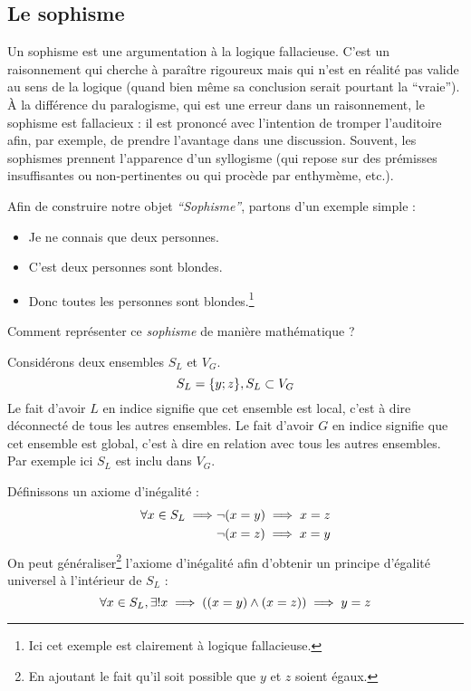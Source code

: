 \documentclass[12pt]{article} %
\begin{document}
\subsection{Le sophisme}

Un sophisme est une argumentation à la logique fallacieuse. C'est un raisonnement qui cherche à paraître rigoureux mais qui n'est en réalité pas valide au sens de la logique (quand bien même sa conclusion serait pourtant la ``vraie''). À la différence du paralogisme, qui est une erreur dans un raisonnement, le sophisme est fallacieux : il est prononcé avec l'intention de tromper l'auditoire afin, par exemple, de prendre l'avantage dans une discussion. Souvent, les sophismes prennent l'apparence d'un syllogisme (qui repose sur des prémisses insuffisantes ou non-pertinentes ou qui procède par enthymème, etc.). \newline

Afin de construire notre objet \textit{``Sophisme''}, partons d'un exemple simple : \newline
\begin{itemize}
\item Je ne connais que deux personnes.
\item C'est deux personnes sont blondes.
\item Donc toutes les personnes sont blondes.\footnote{Ici cet exemple est clairement à logique fallacieuse.} \newline
\end{itemize}
{\large Comment représenter ce \textit{sophisme} de manière mathématique ?}

Considérons deux ensembles $S_{L}$ et $V_{G}$. 
\begin{equation}
S_{L} = \{y; \space z\}, \space S_{L} \subset V_{G}
\end{equation}
Le fait d'avoir $L$ en indice signifie que cet ensemble est local, c'est à dire déconnecté de tous les autres ensembles. \newline
Le fait d'avoir $G$ en indice signifie que cet ensemble est global, c'est à dire en relation avec tous les autres ensembles. Par exemple ici $S_{L}$ est inclu dans $V_{G}$.

Définissons un axiome d'inégalité :
\begin{align} 
\forall x \in S_{L} \implies & \lnot (x \space = \space y) \implies x \space = \space z \\
			         & \lnot (x \space = \space z) \implies x \space = \space y
\end{align}
On peut généraliser\footnote{En ajoutant le fait qu'il soit possible que $y$ et $z$ soient égaux.} l'axiome d'inégalité afin d'obtenir un principe d'égalité universel à l'intérieur de $S_{L}$ : 
\begin{equation}
\forall x \in S_{L}, \space \exists! \space x \implies ((x \space = \space y) \land (x \space = \space z)) \implies y \space = \space z
\end{equation}
\end{document}
